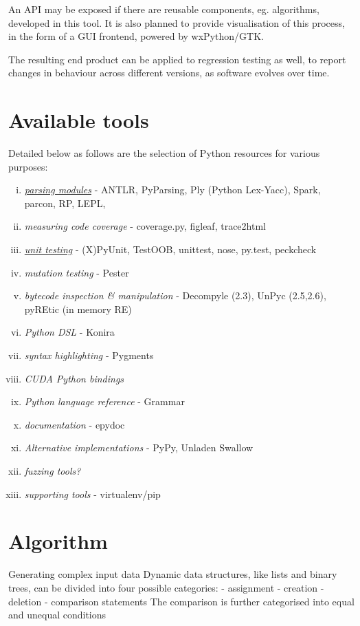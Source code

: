 \documentclass{icldt}
\numberwithin{equation}{section}       %
\begin{document}
{An API may be exposed if there are reusable components, eg. algorithms, developed in this tool. It is also planned to provide visualisation of this process, in the form of a GUI frontend, powered by wxPython/GTK.

The resulting end product can be applied to regression testing as well, to report changes in behaviour across different versions, as software evolves over time.

\section*{Available tools}
Detailed below as follows are the selection of Python resources for various purposes:
\begin{enumerate}[i.]
	\item \emph{\href{http://wiki.python.org/moin/LanguageParsing}{parsing modules}} - ANTLR, PyParsing, Ply (Python Lex-Yacc), Spark, parcon, RP, LEPL, 
	\item \emph{measuring code coverage} - coverage.py, figleaf, trace2html
	\item \emph{\href{http://wiki.python.org/moin/PythonTestingToolsTaxonomy}{unit testing}} - (X)PyUnit, TestOOB, unittest, nose, py.test, peckcheck
	\item \emph{mutation testing} - Pester
	\item \emph{bytecode inspection \& manipulation} - Decompyle (2.3), UnPyc (2.5,2.6), pyREtic (in memory RE)
	\item \emph{Python DSL} - Konira
	\item \emph{syntax highlighting} - Pygments
	\item \emph{CUDA Python bindings}
	\item \emph{Python language reference} - Grammar
	\item \emph{documentation} - epydoc
	\item \emph{Alternative implementations} - PyPy, Unladen Swallow
	\item \emph{fuzzing tools?}
	\item \emph{supporting tools} - virtualenv/pip
\end{enumerate}
\section{Algorithm}

Generating complex input data
	Dynamic data structures, like lists and binary trees, can be divided into four possible categories\cite{Zhao2007}:
		- assignment
		- creation
		- deletion
		- comparison statements
			The comparison is further categorised into equal and unequal conditions

}
\end{document}
